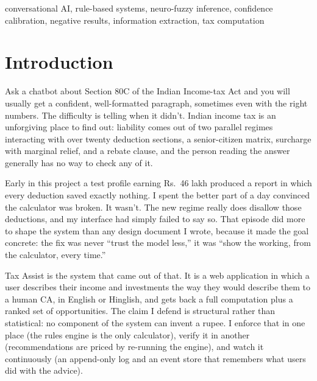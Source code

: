 \documentclass[conference]{IEEEtran}
\begin{document}
\begin{IEEEkeywords}
\normalfont\normalsize
conversational AI, rule-based systems, neuro-fuzzy inference,
confidence calibration, negative results, information extraction,
tax computation
\end{IEEEkeywords}

\section{Introduction}
Ask a chatbot about Section 80C of the Indian Income-tax Act and you
will usually get a confident, well-formatted paragraph, sometimes even
with the right numbers. The difficulty is telling when it didn't.
Indian income tax is an unforgiving place to find out: liability comes
out of two parallel regimes interacting with over twenty deduction
sections, a senior-citizen matrix, surcharge with marginal relief, and
a rebate clause, and the person reading the answer generally has no
way to check any of it.

Early in this project a test profile earning Rs.~46 lakh produced a
report in which every deduction saved exactly nothing. I spent the
better part of a day convinced the calculator was broken. It wasn't.
The new regime really does disallow those deductions, and my interface
had simply failed to say so. That episode did more to shape the system
than any design document I wrote, because it made the goal concrete:
the fix was never ``trust the model less,'' it was ``show the
working, from the calculator, every time.''

Tax Assist is the system that came out of that. It is a web
application in which a user describes their income and investments the
way they would describe them to a human CA, in English or Hinglish,
and gets back a full computation plus a ranked set of opportunities.
The claim I defend is structural rather than statistical: no component
of the system can invent a rupee. I enforce that in one place (the
rules engine is the only calculator), verify it in another
(recommendations are priced by re-running the engine), and watch it
continuously (an append-only log and an event store that remembers
what users did with the advice).
\end{document}
